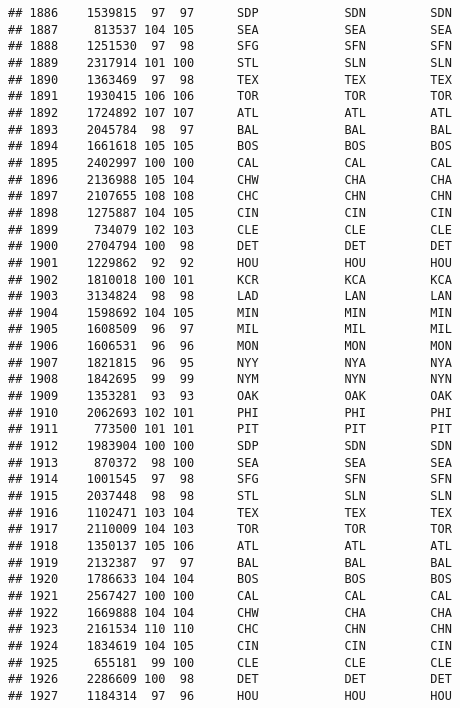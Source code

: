 \documentclass[]{article}
\begin{document}
\begin{verbatim}
## 1886    1539815  97  97      SDP            SDN         SDN
## 1887     813537 104 105      SEA            SEA         SEA
## 1888    1251530  97  98      SFG            SFN         SFN
## 1889    2317914 101 100      STL            SLN         SLN
## 1890    1363469  97  98      TEX            TEX         TEX
## 1891    1930415 106 106      TOR            TOR         TOR
## 1892    1724892 107 107      ATL            ATL         ATL
## 1893    2045784  98  97      BAL            BAL         BAL
## 1894    1661618 105 105      BOS            BOS         BOS
## 1895    2402997 100 100      CAL            CAL         CAL
## 1896    2136988 105 104      CHW            CHA         CHA
## 1897    2107655 108 108      CHC            CHN         CHN
## 1898    1275887 104 105      CIN            CIN         CIN
## 1899     734079 102 103      CLE            CLE         CLE
## 1900    2704794 100  98      DET            DET         DET
## 1901    1229862  92  92      HOU            HOU         HOU
## 1902    1810018 100 101      KCR            KCA         KCA
## 1903    3134824  98  98      LAD            LAN         LAN
## 1904    1598692 104 105      MIN            MIN         MIN
## 1905    1608509  96  97      MIL            MIL         MIL
## 1906    1606531  96  96      MON            MON         MON
## 1907    1821815  96  95      NYY            NYA         NYA
## 1908    1842695  99  99      NYM            NYN         NYN
## 1909    1353281  93  93      OAK            OAK         OAK
## 1910    2062693 102 101      PHI            PHI         PHI
## 1911     773500 101 101      PIT            PIT         PIT
## 1912    1983904 100 100      SDP            SDN         SDN
## 1913     870372  98 100      SEA            SEA         SEA
## 1914    1001545  97  98      SFG            SFN         SFN
## 1915    2037448  98  98      STL            SLN         SLN
## 1916    1102471 103 104      TEX            TEX         TEX
## 1917    2110009 104 103      TOR            TOR         TOR
## 1918    1350137 105 106      ATL            ATL         ATL
## 1919    2132387  97  97      BAL            BAL         BAL
## 1920    1786633 104 104      BOS            BOS         BOS
## 1921    2567427 100 100      CAL            CAL         CAL
## 1922    1669888 104 104      CHW            CHA         CHA
## 1923    2161534 110 110      CHC            CHN         CHN
## 1924    1834619 104 105      CIN            CIN         CIN
## 1925     655181  99 100      CLE            CLE         CLE
## 1926    2286609 100  98      DET            DET         DET
## 1927    1184314  97  96      HOU            HOU         HOU

\end{verbatim}
\end{document}
